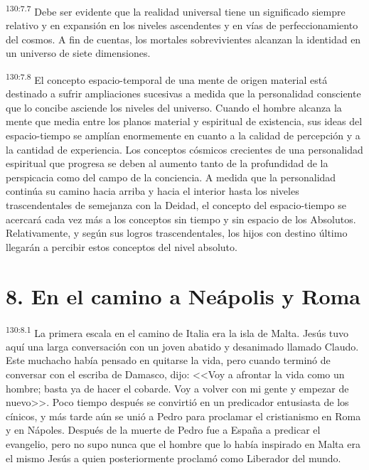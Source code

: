 \par 
\textsuperscript{130:7.7} Debe ser evidente que la realidad universal tiene un significado siempre relativo y en expansión en los niveles ascendentes y en vías de perfeccionamiento del cosmos. A fin de cuentas, los mortales sobrevivientes alcanzan la identidad en un universo de siete dimensiones.

\par 
\textsuperscript{130:7.8} El concepto espacio-temporal de una mente de origen material está destinado a sufrir ampliaciones sucesivas a medida que la personalidad consciente que lo concibe asciende los niveles del universo. Cuando el hombre alcanza la mente que media entre los planos material y espiritual de existencia, sus ideas del espacio-tiempo se amplían enormemente en cuanto a la calidad de percepción y a la cantidad de experiencia. Los conceptos cósmicos crecientes de una personalidad espiritual que progresa se deben al aumento tanto de la profundidad de la perspicacia como del campo de la conciencia. A medida que la personalidad continúa su camino hacia arriba y hacia el interior hasta los niveles trascendentales de semejanza con la Deidad, el concepto del espacio-tiempo se acercará cada vez más a los conceptos sin tiempo y sin espacio de los Absolutos. Relativamente, y según sus logros trascendentales, los hijos con destino último llegarán a percibir estos conceptos del nivel absoluto.

\section*{8. En el camino a Neápolis y Roma}
\par 
\textsuperscript{130:8.1} La primera escala en el camino de Italia era la isla de Malta. Jesús tuvo aquí una larga conversación con un joven abatido y desanimado llamado Claudo. Este muchacho había pensado en quitarse la vida, pero cuando terminó de conversar con el escriba de Damasco, dijo: <<Voy a afrontar la vida como un hombre; basta ya de hacer el cobarde. Voy a volver con mi gente y empezar de nuevo>>. Poco tiempo después se convirtió en un predicador entusiasta de los cínicos, y más tarde aún se unió a Pedro para proclamar el cristianismo en Roma y en Nápoles. Después de la muerte de Pedro fue a España a predicar el evangelio, pero no supo nunca que el hombre que lo había inspirado en Malta era el mismo Jesús a quien posteriormente proclamó como Liberador del mundo.

